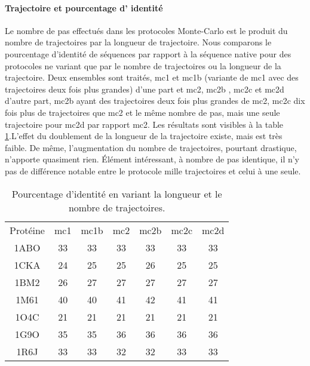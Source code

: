    \paragraph{Trajectoire et pourcentage d' identité} 

Le nombre de pas effectués dans les protocoles Monte-Carlo est le produit du nombre de trajectoires par la longueur de trajectoire. Nous comparons le pourcentage d'identité de séquences par rapport à la séquence native pour des protocoles ne variant que par le nombre de trajectoires ou la longueur de la trajectoire. Deux ensembles sont traités, mc1 et mc1b (variante de mc1 avec des trajectoires deux fois plus grandes) d'une part et mc2, mc2b , mc2c et mc2d d'autre part, mc2b ayant des trajectoires deux fois plus grandes de mc2, mc2c dix fois plus de trajectoires que mc2 et le même nombre de pas, mais une seule trajectoire pour mc2d par rapport mc2.
Les résultats sont visibles à la table \ref{tab:Traj_ident}.L'effet du doublement de la longueur de la trajectoire existe, mais est très faible. De même, l'augmentation du nombre de trajectoires, pourtant drastique, n'apporte quasiment rien. Élément intéressant, à nombre de pas identique, il n'y pas de différence notable entre le protocole mille trajectoires et celui à une seule.  

    \begin{table}[!htbp]
      \centering
      
      \begin{tabular}{ccccccc}

        \toprule
        Protéine & mc1 & mc1b & mc2  & mc2b & mc2c & mc2d  \\
        \cmidrule{1-7}      
        1ABO & 33 & 33 & 33 & 33 & 33  & 33 \\      
        1CKA & 24 & 25 & 25 & 26 & 25  & 25 \\  
        1BM2 & 26 & 27 & 27 & 27 & 27  & 27 \\  
        1M61 & 40 & 40 & 41 & 42 & 41  & 41 \\  
        1O4C & 21 & 21 & 21 & 21 & 21  & 21 \\  
        1G9O & 35 & 35 & 36 & 36 & 36  & 36 \\  
        1R6J & 33 & 33 & 32 & 32 & 33  & 33 \\  
        \bottomrule
      \end{tabular}
      

      \caption{Pourcentage d'identité en variant la longueur et le nombre de trajectoires.}      
      \label{tab:Traj_ident}
    \end{table}


